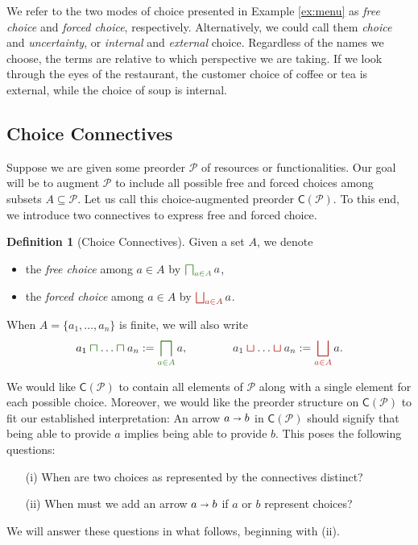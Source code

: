 \documentclass[12pt]{article}
\theoremstyle{definition}
\newtheorem{definition}{Definition}[section]
\theoremstyle{plain}
\theoremstyle{plain}
\theoremstyle{plain}
\theoremstyle{plain}
\theoremstyle{remark}
\theoremstyle{remark}
\newcommand{\mc}[1]{\mathcal{#1}}
\newcommand{\sub}{\subseteq}
\newcommand{\cbigsqcap}[1]{\color{OliveGreen}\bigsqcap_{#1}\color{Black}}
\newcommand{\csqcap}{\color{OliveGreen}\bm{\sqcap}\color{Black}}
\newcommand{\cbigsqcup}[1]{\color{BrickRed}\bigsqcup_{#1}\color{Black}}
\newcommand{\csqcup}{\color{BrickRed}\bm{\sqcup}\color{Black}}
\begin{document}
We refer to the two modes of choice presented in Example \ref{ex:menu} as \emph{free choice} and \emph{forced choice}, respectively. Alternatively, we could call them \emph{choice} and \emph{uncertainty}, or \emph{internal} and \emph{external} choice. Regardless of the names we choose, the terms are relative to which perspective we are taking. If we look through the eyes of the restaurant, the customer choice of coffee or tea is external, while the choice of soup is internal.

\subsection{Choice Connectives}
Suppose we are given some preorder $\mc{P}$ of resources or functionalities. Our goal will be to augment $\mc{P}$ to include all possible free and forced choices among subsets $A \sub \mc{P}$. Let us call this choice-augmented preorder $\mathsf{C}(\mc{P})$. To this end, we introduce two connectives to express free and forced choice.

\begin{definition}[Choice Connectives] Given a set $A$, we denote
	\begin{itemize}
		\item the \emph{free choice} among $a \in A$ by $\cbigsqcap{a \in A} a$,
		\item the \emph{forced choice} among $a \in A$ by $\cbigsqcup{a \in A} a$.
	\end{itemize}
	When $A=\{a_1,\ldots,a_n\}$ is finite, we will also write 
	$$a_1 \csqcap \ldots \csqcap a_n := \cbigsqcap{a \in A} a, \qquad \qquad a_1 \csqcup \ldots \csqcup a_n := \cbigsqcup{a \in A} a.$$
\end{definition}

We would like $\mathsf{C}(\mc{P})$ to contain all elements of $\mc{P}$ along with a single element for each possible choice. Moreover, we would like the preorder structure on $\mathsf{C}(\mc{P})$ to fit our established interpretation: An arrow $a \shortrightarrow b$ in $\mathsf{C}(\mc{P})$ should signify that being able to provide $a$ implies being able to provide $b$. This poses the following questions:
\begin{itemize}
	\item[(i)] When are two choices as represented by the connectives distinct?
	\item[(ii)] When must we add an arrow $a \shortrightarrow b$ if $a$ or $b$ represent choices?
\end{itemize}
We will answer these questions in what follows, beginning with (ii).
\end{document}

